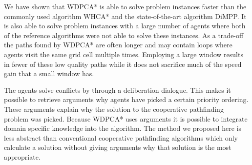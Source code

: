 We have shown that WDPCA* is able to solve problem instances faster than the
commonly used algorithm WHCA* and the state-of-the-art algorithm DiMPP. It is
also able to solve problem instances with a large number of agents where both
of the reference algorithms were not able to solve these instances. As a
trade-off the paths found by WDPCA* are often longer and may contain loops
where agents visit the same grid cell multiple times. Employing a large window
results in fewer of these low quality paths while it does not sacrifice much of
the speed gain that a small window has.

The agents solve conflicts by through a deliberation dialogue. This makes it
possible to retrieve arguments why agents have picked a certain priority
ordering. These arguments explain why the solution to the cooperative
pathfinding problem was picked. Because WDPCA* uses arguments it is possible to
integrate domain specific knowledge into the algorithm. The method we proposed
here is less abstract than conventional cooperative pathfinding algorithms
which only calculate a solution without giving arguments why that solution is
the most appropriate.
